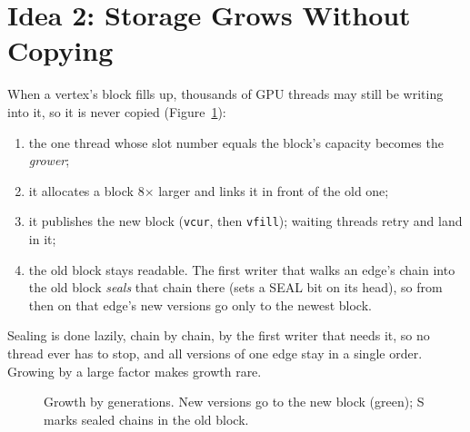 \documentclass[11pt,a4paper,oneside]{report}
\newcommand{\code}[1]{\texttt{#1}}
\begin{document}
\section{Idea 2: Storage Grows Without Copying}
When a vertex's block fills up, thousands of GPU threads may still be writing into it, so it is never copied
(Figure~\ref{fig:grow}):
\begin{enumerate}
\item the one thread whose slot number equals the block's capacity becomes the \emph{grower};
\item it allocates a block 8$\times$ larger and links it in front of the old one;
\item it publishes the new block (\code{vcur}, then \code{vfill}); waiting threads retry and land in it;
\item the old block stays readable. The first writer that walks an edge's chain into the old block \emph{seals} that
  chain there (sets a SEAL bit on its head), so from then on that edge's new versions go only to the newest block.
\end{enumerate}
Sealing is done lazily, chain by chain, by the first writer that needs it, so no thread ever has to stop, and all
versions of one edge stay in a single order. Growing by a large factor makes growth rare.

\begin{figure}[H]
\centering
{}
\caption{Growth by generations. New versions go to the new block (green); S marks sealed chains in the old block.}
\label{fig:grow}
\end{figure}
\end{document}
